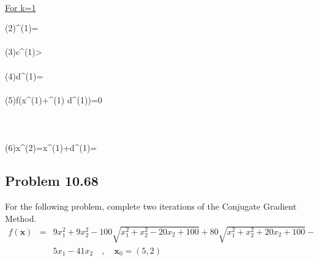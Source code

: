 \documentclass[]{report}
\begin{document}
\\
\underline{For k=1}
\begin{program}
\left(2\right)\quad {}^{(1)}=\left[38.8\ , \ -17.5\right]\\~  \\
\left(3\right)\quad \lvert \mathbf c^{(1)}>\epsilon\\~  \\
\left(4\right)\quad \mathbf d^{(1)}=\left[-38.8\ , \ 17.5\right]\\~  \\
\left(5\right)\quad \delta f\left(\mathbf x^{(1)}+\alpha^{(1)} \mathbf d^{(1)}\right)=0\\~  \\
\quad \quad \quad \quad \quad \quad \quad \quad \quad {}\\~\\
\left(6\right)\quad \mathbf x^{(2)}=\mathbf x^{(1)}+\mathbf d^{(1)}=\left[0.063\ , \ -7.9\right]
\end{program}
\subsection*{Problem 10.68}
For the following problem, complete two iterations of the Conjugate Gradient Method.
\begin{eqnarray*}
f\left(\mathbf x\right)&=&9x_1^2+9x_2^2-100\sqrt{x_1^2+x_2^2-20x_2+100}+80\sqrt{x_1^2+x_2^2+20x_2+100}-\\&&5x_1-41x_2 \quad,\quad \mathbf{x}_0=\left(5,2\right)
\end{eqnarray*}
\end{document}
